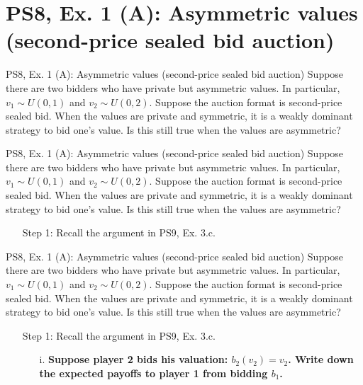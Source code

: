 \section{PS8, Ex. 1 (A): Asymmetric values (second-price sealed bid auction)}

\begin{frame}{PS8, Ex. 1 (A): Asymmetric values (second-price sealed bid auction)}
    Suppose there are two bidders who have private but asymmetric values. In particular, $v_1\sim U(0, 1)$ and $v_2\sim U(0, 2)$. Suppose the auction format is second-price sealed bid. When the values are private and symmetric, it is a weakly dominant strategy to bid one’s value. Is this still true when the values are asymmetric?
\end{frame}

\begin{frame}{PS8, Ex. 1 (A): Asymmetric values (second-price sealed bid auction)}
    Suppose there are two bidders who have private but asymmetric values. In particular, $v_1\sim U(0, 1)$ and $v_2\sim U(0, 2)$. Suppose the auction format is second-price sealed bid. When the values are private and symmetric, it is a weakly dominant strategy to bid one’s value. Is this still true when the values are asymmetric?
    \begin{multicols}{2}
      \begin{itemize}
        \item[Step 1:] Recall the argument in PS9, Ex. 3.c.
      \end{itemize}
      \vfill\null\columnbreak
      \vfill\null
    \end{multicols}
\end{frame}
\begin{frame}{PS8, Ex. 1 (A): Asymmetric values (second-price sealed bid auction)}
    Suppose there are two bidders who have private but asymmetric values. In particular, $v_1\sim U(0, 1)$ and $v_2\sim U(0, 2)$. Suppose the auction format is second-price sealed bid. When the values are private and symmetric, it is a weakly dominant strategy to bid one’s value. Is this still true when the values are asymmetric?
    \begin{multicols}{2}
      \begin{itemize}
        \item[Step 1:] Recall the argument in PS9, Ex. 3.c.
        \begin{itemize}\normalsize
          \item[i.]   \textbf{Suppose player 2 bids his valuation: $b_2(v_2) = v_2$. Write down the expected payoffs to player 1 from bidding $b_1$.}
        \end{itemize}
      \end{itemize}
      \vfill\null\columnbreak
      \vfill\null
    \end{multicols}
\end{frame}
